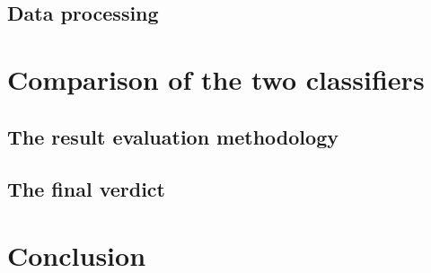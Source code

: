 \documentclass[12pt]{article}
\begin{document}
\subsection{Data processing}				\label{sec:processing2}			

\section{Comparison of the two classifiers}		\label{sec:comparison}
\subsection{The result evaluation methodology}	\label{sec:evaluation}			
\subsection{The final verdict}				\label{sec:verdict}				

\section{Conclusion}					\label{sec:concluision}			
\end{document}
